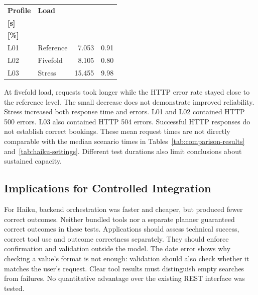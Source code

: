 \par\medskip
\noindent\begin{minipage}{\columnwidth}
    \label{tab:load-results}
    \centering\small
    \renewcommand{\arraystretch}{1.12}
    \setlength{\tabcolsep}{3pt}
    \begin{tabular*}{\linewidth}{@{\extracolsep{\fill}}llrr@{}}
        \toprule
        \textbf{Profile} & \textbf{Load} & \shortstack{\textbf{Mean time}\\\textbf{[s]}} & \shortstack{\textbf{HTTP errors}\\\textbf{[\%]}} \\
        \midrule
        L01 & Reference & 7.053 & 0.91 \\
        L02 & Fivefold & 8.105 & 0.80 \\
        L03 & Stress & 15.455 & 9.98 \\
        \bottomrule
    \end{tabular*}
\end{minipage}
\par\medskip

At fivefold load, requests took longer while the HTTP error rate stayed close to the reference level.
The small decrease does not demonstrate improved reliability.
Stress increased both response time and errors.
L01 and L02 contained HTTP 500 errors.
L03 also contained HTTP 504 errors.
Successful HTTP responses do not establish correct bookings.
These mean request times are not directly comparable with the median scenario times in Tables~\ref{tab:comparison-results} and~\ref{tab:haiku-settings}.
Different test durations also limit conclusions about sustained capacity.

\subsection{Implications for Controlled Integration}
For Haiku, backend orchestration was faster and cheaper, but produced fewer correct outcomes.
Neither bundled tools nor a separate planner guaranteed correct outcomes in these tests.
Applications should assess technical success, correct tool use and outcome correctness separately.
They should enforce confirmation and validation outside the model.
The date error shows why checking a value's format is not enough: validation should also check whether it matches the user's request.
Clear tool results must distinguish empty searches from failures.
No quantitative advantage over the existing REST interface was tested.
